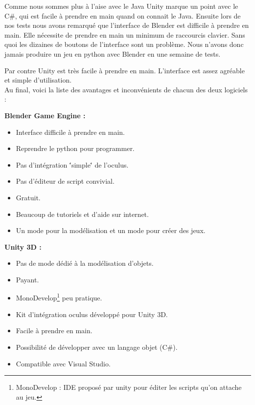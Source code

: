 \documentclass[a4paper,11pt]{myreport}
\begin{document}
\par Comme nous sommes plus à l'aise avec le Java Unity marque un point avec le C\#, qui est facile à prendre en main quand on connait le Java. Ensuite lors de nos tests nous avons remarqué que l'interface de Blender est difficile à prendre en main. Elle nécessite de prendre en main un minimum de raccourcis clavier. Sans quoi les dizaines de boutons de l'interface sont un problème. Nous n'avons donc jamais produire un jeu en python avec Blender en une semaine de tests.
\par Par contre Unity est très facile à prendre en main. L'interface est assez agréable et simple d'utilisation.
\\Au final, voici la liste des avantages et inconvénients de chacun des deux logiciels :

  \begin{description}
  	\item \textbf{Blender Game Engine :}
  	\begin{itemize}
  		\item Interface difficile à prendre en main.
  		\item Reprendre le python pour programmer.
  		\item Pas d'intégration \''simple\'' de l'oculus.
  		\item Pas d'éditeur de script convivial.
  		\item Gratuit.
  		\item Beaucoup de tutoriels et d'aide sur internet.
  		\item Un mode pour la modélisation et un mode pour créer des jeux.
  	\end{itemize}
  	\item \textbf{Unity 3D :}
  		\begin{itemize}
  			\item Pas de mode dédié à la modélisation d'objets.
  			\item Payant.
  			\item MonoDevelop\footnote{MonoDevelop : IDE proposé par unity pour éditer les scripts qu'on attache au jeu.} peu pratique.
  			\item Kit d'intégration oculus développé pour Unity 3D.
  			\item Facile à prendre en main.
  			\item Possibilité de développer avec un langage objet (C\#).
  			\item Compatible avec Visual Studio.
  		\end{itemize}
  \end{description}
  
\end{document}
